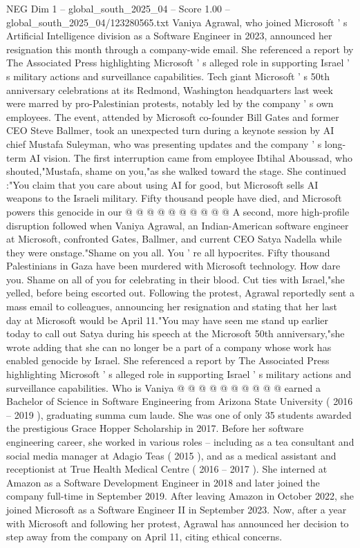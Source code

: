 \begin{textsample}{NEG Dim 1 – global\_south\_2025\_04 – Score 1.00 – global\_south\_2025\_04/123280565.txt}  \label{ex:f1_neg_131}
Vaniya Agrawal, who joined Microsoft ' s Artificial Intelligence division as a Software Engineer in 2023, announced her resignation this month through a company-wide email.
She referenced a report by The Associated Press highlighting Microsoft ' s alleged role in supporting Israel ' s military actions and surveillance capabilities.
Tech giant Microsoft ' s 50th anniversary celebrations at its Redmond, Washington headquarters last week were marred by pro-Palestinian protests, notably led by the company ' s own employees.
The event, attended by Microsoft co-founder Bill Gates and former CEO Steve Ballmer, took an unexpected turn during a keynote session by AI chief Mustafa Suleyman, who was presenting updates and the company ' s long-term AI vision.
The first interruption came from employee Ibtihal Aboussad, who shouted,"Mustafa, shame on you,"as she walked toward the stage.
She continued :"You claim that you care about using AI for good, but Microsoft sells AI weapons to the Israeli military.
Fifty thousand people have died, and Microsoft powers this genocide in our @ @ @ @ @ @ @ @ @ @ A second, more high-profile disruption followed when Vaniya Agrawal, an Indian-American software engineer at Microsoft, confronted Gates, Ballmer, and current CEO Satya Nadella while they were onstage."Shame on you all.
You ' re all hypocrites.
Fifty thousand Palestinians in Gaza have been murdered with Microsoft technology.
How dare you.
Shame on all of you for celebrating in their blood.
Cut ties with Israel,"she yelled, before being escorted out.
Following the protest, Agrawal reportedly sent a mass email to colleagues, announcing her resignation and stating that her last day at Microsoft would be April 11."You may have seen me stand up earlier today to call out Satya during his speech at the Microsoft 50th anniversary,"she wrote adding that she can no longer be a part of a company whose work has enabled genocide by Israel.
She referenced a report by The Associated Press highlighting Microsoft ' s alleged role in supporting Israel ' s military actions and surveillance capabilities.
Who is Vaniya @ @ @ @ @ @ @ @ @ @ earned a Bachelor of Science in Software Engineering from Arizona State University ( 2016 -- 2019 ), graduating summa cum laude.
She was one of only 35 students awarded the prestigious Grace Hopper Scholarship in 2017.
Before her software engineering career, she worked in various roles -- including as a tea consultant and social media manager at Adagio Teas ( 2015 ), and as a medical assistant and receptionist at True Health Medical Centre ( 2016 -- 2017 ).
She interned at Amazon as a Software Development Engineer in 2018 and later joined the company full-time in September 2019.
After leaving Amazon in October 2022, she joined Microsoft as a Software Engineer II in September 2023.
Now, after a year with Microsoft and following her protest, Agrawal has announced her decision to step away from the company on April 11, citing ethical concerns.

\end{textsample}
